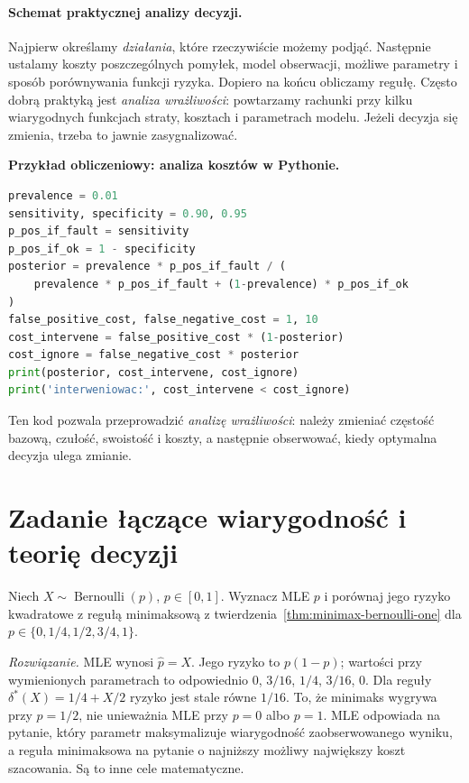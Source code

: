 \paragraph{Schemat praktycznej analizy decyzji.}
Najpierw określamy \emph{działania}, które rzeczywiście możemy podjąć.
Następnie ustalamy koszty poszczególnych pomyłek, model obserwacji,
możliwe parametry i sposób porównywania funkcji ryzyka. Dopiero
na końcu obliczamy regułę. Często dobrą praktyką jest \emph{analiza
wrażliwości}: powtarzamy rachunki przy kilku wiarygodnych funkcjach
straty, kosztach i parametrach modelu. Jeżeli decyzja się zmienia,
trzeba to jawnie zasygnalizować.

\noindent\textbf{Przykład obliczeniowy: analiza kosztów w Pythonie.}\par
\par
{}
\smallskip
\begin{lstlisting}[language=Python,caption={Wpływ kosztów pomyłek na decyzję (Python).}]
prevalence = 0.01
sensitivity, specificity = 0.90, 0.95
p_pos_if_fault = sensitivity
p_pos_if_ok = 1 - specificity
posterior = prevalence * p_pos_if_fault / (
    prevalence * p_pos_if_fault + (1-prevalence) * p_pos_if_ok
)
false_positive_cost, false_negative_cost = 1, 10
cost_intervene = false_positive_cost * (1-posterior)
cost_ignore = false_negative_cost * posterior
print(posterior, cost_intervene, cost_ignore)
print('interweniowac:', cost_intervene < cost_ignore)
\end{lstlisting}
Ten kod pozwala przeprowadzić \emph{analizę wrażliwości}: należy
zmieniać częstość bazową, czułość, swoistość i koszty, a następnie
obserwować, kiedy optymalna decyzja ulega zmianie.

\section{Zadanie łączące wiarygodność i teorię decyzji}
\begin{zadanie}\label{zad:compare-likelihood-decision}
Niech $X\sim\operatorname{Bernoulli}(p)$, $p\in[0,1]$.
Wyznacz MLE $p$ i porównaj jego ryzyko kwadratowe z regułą minimaksową
z twierdzenia~\ref{thm:minimax-bernoulli-one} dla
$p\in\{0,1/4,1/2,3/4,1\}$.
\par\emph{Rozwiązanie.} MLE wynosi $\widehat p=X$.
Jego ryzyko to $p(1-p)$; wartości przy wymienionych parametrach to
odpowiednio $0$, $3/16$, $1/4$, $3/16$, $0$.
Dla reguły $\delta^*(X)=1/4+X/2$ ryzyko jest stale równe $1/16$.
To, że minimaks wygrywa przy $p=1/2$, nie unieważnia MLE przy
$p=0$ albo $p=1$. MLE odpowiada na pytanie, który parametr
maksymalizuje wiarygodność zaobserwowanego wyniku, a reguła
minimaksowa na pytanie o najniższy możliwy największy koszt
szacowania. Są to inne cele matematyczne.
\end{zadanie}

